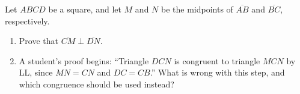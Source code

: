 Let $ABCD$ be a square, and let $M$ and $N$ be the midpoints of $\overline{AB}$ and $\overline{BC}$, respectively.
\begin{enumerate}
\item[(a)] Prove that $\overline{CM}\perp\overline{DN}$.
\item[(b)] A student's proof begins: ``Triangle $DCN$ is congruent to triangle $MCN$ by LL, since $MN=CN$ and $DC=CB$.'' What is wrong with this step, and which congruence should be used instead?
\end{enumerate}
